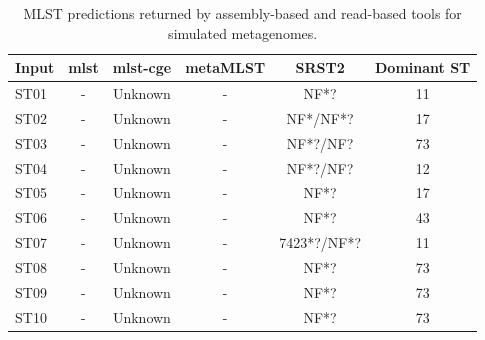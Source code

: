 \begin{table}

\caption{\label{tab:tab:MLST_predictions}MLST predictions returned by assembly-based and read-based tools for simulated metagenomes.}
\centering
\begin{tabular}[t]{lccccc}
\toprule
Input & mlst & mlst-cge & metaMLST & SRST2 & Dominant ST\\
\midrule
ST01 & - & Unknown & - & NF*? & 11\\
ST02 & - & Unknown & - & NF*/NF*? & 17\\
ST03 & - & Unknown & - & NF*?/NF? & 73\\
ST04 & - & Unknown & - & NF*?/NF? & 12\\
ST05 & - & Unknown & - & NF*? & 17\\
\addlinespace
ST06 & - & Unknown & - & NF*? & 43\\
ST07 & - & Unknown & - & 7423*?/NF*? & 11\\
ST08 & - & Unknown & - & NF*? & 73\\
ST09 & - & Unknown & - & NF*? & 73\\
ST10 & - & Unknown & - & NF*? & 73\\
\bottomrule
\end{tabular}
\end{table}
